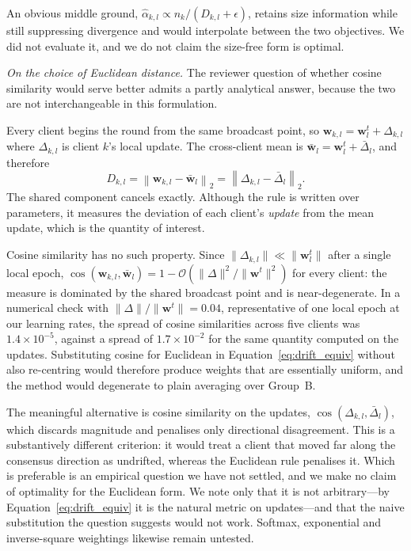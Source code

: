 \documentclass{ieeeaccess}
\begin{document}
An obvious middle ground, $\hat{\alpha}_{k,l} \propto n_k / (D_{k,l}+\epsilon)$, retains size information while still suppressing divergence and would interpolate between the two objectives. We did not evaluate it, and we do not claim the size-free form is optimal.

\emph{On the choice of Euclidean distance.} The reviewer question of whether cosine similarity would serve better admits a partly analytical answer, because the two are not interchangeable in this formulation.

Every client begins the round from the same broadcast point, so $\mathbf{w}_{k,l} = \mathbf{w}_l^t + \Delta_{k,l}$ where $\Delta_{k,l}$ is client $k$'s local update. The cross-client mean is $\bar{\mathbf{w}}_l = \mathbf{w}_l^t + \bar{\Delta}_l$, and therefore
\begin{equation}
\label{eq:drift_equiv}
D_{k,l} = \left\|\mathbf{w}_{k,l} - \bar{\mathbf{w}}_l\right\|_2
        = \left\|\Delta_{k,l} - \bar{\Delta}_l\right\|_2 .
\end{equation}
The shared component cancels exactly. Although the rule is written over parameters, it measures the deviation of each client's \emph{update} from the mean update, which is the quantity of interest.

Cosine similarity has no such property. Since $\|\Delta_{k,l}\| \ll \|\mathbf{w}_l^t\|$ after a single local epoch, $\cos(\mathbf{w}_{k,l}, \bar{\mathbf{w}}_l) = 1 - \mathcal{O}\!\left(\|\Delta\|^2/\|\mathbf{w}^t\|^2\right)$ for every client: the measure is dominated by the shared broadcast point and is near-degenerate. In a numerical check with $\|\Delta\|/\|\mathbf{w}^t\| = 0.04$, representative of one local epoch at our learning rates, the spread of cosine similarities across five clients was $1.4\times10^{-5}$, against a spread of $1.7\times10^{-2}$ for the same quantity computed on the updates. Substituting cosine for Euclidean in Equation~\eqref{eq:drift_equiv} without also re-centring would therefore produce weights that are essentially uniform, and the method would degenerate to plain averaging over Group~B.

The meaningful alternative is cosine similarity on the updates, $\cos(\Delta_{k,l}, \bar{\Delta}_l)$, which discards magnitude and penalises only directional disagreement. This is a substantively different criterion: it would treat a client that moved far along the consensus direction as undrifted, whereas the Euclidean rule penalises it. Which is preferable is an empirical question we have not settled, and we make no claim of optimality for the Euclidean form. We note only that it is not arbitrary---by Equation~\eqref{eq:drift_equiv} it is the natural metric on updates---and that the naive substitution the question suggests would not work. Softmax, exponential and inverse-square weightings likewise remain untested.
\end{document}
